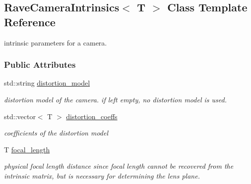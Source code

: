 \hypertarget{classOpenRAVE_1_1geometry_1_1RaveCameraIntrinsics}{
\subsection{RaveCameraIntrinsics$<$ T $>$ Class Template Reference}
\label{classOpenRAVE_1_1geometry_1_1RaveCameraIntrinsics}
}


intrinsic parameters for a camera.  


\subsubsection*{Public Attributes}
\begin{DoxyCompactItemize}
\item 
std::string \hyperlink{classOpenRAVE_1_1geometry_1_1RaveCameraIntrinsics_ac689303f406328d3c603051e11b482bf}{distortion\_\-model}
\begin{DoxyCompactList}\small\item\em distortion model of the camera. if left empty, no distortion model is used. \item\end{DoxyCompactList}\item 
\hypertarget{classOpenRAVE_1_1geometry_1_1RaveCameraIntrinsics_a74815f0494513cfbdb460a0d7365fed0}{
std::vector$<$ T $>$ \hyperlink{classOpenRAVE_1_1geometry_1_1RaveCameraIntrinsics_a74815f0494513cfbdb460a0d7365fed0}{distortion\_\-coeffs}}
\label{classOpenRAVE_1_1geometry_1_1RaveCameraIntrinsics_a74815f0494513cfbdb460a0d7365fed0}

\begin{DoxyCompactList}\small\item\em coefficients of the distortion model \item\end{DoxyCompactList}\item 
\hypertarget{classOpenRAVE_1_1geometry_1_1RaveCameraIntrinsics_a93fa88200ad87160883fd23fd0663e49}{
T \hyperlink{classOpenRAVE_1_1geometry_1_1RaveCameraIntrinsics_a93fa88200ad87160883fd23fd0663e49}{focal\_\-length}}
\label{classOpenRAVE_1_1geometry_1_1RaveCameraIntrinsics_a93fa88200ad87160883fd23fd0663e49}

\begin{DoxyCompactList}\small\item\em physical focal length distance since focal length cannot be recovered from the intrinsic matrix, but is necessary for determining the lens plane. \item\end{DoxyCompactList}\end{DoxyCompactItemize}


